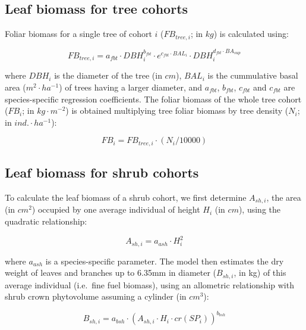 \documentclass[]{book}
\begin{document}
\subsection{Leaf biomass for tree
cohorts}\label{leaf-biomass-for-tree-cohorts}

Foliar biomass for a single tree of cohort \(i\) (\(FB_{tree,i}\); in
\(kg\)) is calculated using:

\begin{equation}
FB_{tree,i} = a_{fbt} \cdot DBH_{i}^{b_{fbt}}\cdot e^{c_{fbt}\cdot BAL_i} \cdot DBH_{i}^{d_{fbt} \cdot BA_{sup}}
\label{eq:onetreefoliarbiomass}
\end{equation}

where \(DBH_{i}\) is the diameter of the tree (in \(cm\)), \(BAL_i\) is
the cummulative basal area (\(m^2\cdot ha^{-1}\)) of trees having a
larger diameter, and \(a_{fbt}\), \(b_{fbt}\), \(c_{fbt}\) and
\(c_{fbt}\) are species-specific regression coefficients. The foliar
biomass of the whole tree cohort (\(FB_{i}\); in \(kg\cdot m^{-2}\)) is
obtained multiplying tree foliar biomass by tree density (\(N_{i}\); in
\(ind.\cdot ha^{-1}\)):

\begin{equation}
FB_{i} = FB_{tree,i}\cdot (N_{i}/10000)
\label{eq:treefoliarbiomass}
\end{equation}

\subsection{Leaf biomass for shrub
cohorts}\label{leaf-biomass-for-shrub-cohorts}

To calculate the leaf biomass of a shrub cohort, we first determine
\(A_{sh,i}\), the area (in \(cm^2\)) occupied by one average individual
of height \(H_{i}\) (in \(cm\)), using the quadratic relationship:

\begin{equation}
A_{sh,i} = a_{ash} \cdot H_{i}^2
\end{equation}

where \(a_{ash}\) is a species-specific parameter. The model then
estimates the dry weight of leaves and branches up to 6.35mm in diameter
(\(B_{sh,i}\), in kg) of this average individual (i.e.~fine fuel
biomass), using an allometric relationship with shrub crown phytovolume
assuming a cylinder (in \(cm^3\)):

\begin{equation}
B_{sh,i} = a_{bsh} \cdot (A_{sh,i}\cdot H_{i}\cdot cr(SP_i))^{b_{bsh}}
\end{equation}
\end{document}
